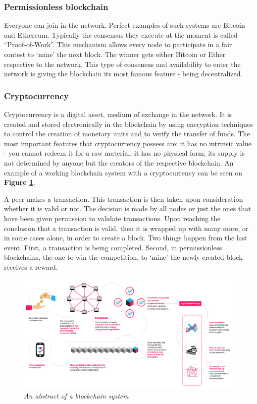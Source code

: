\documentclass[a4paper,11pt]{report}
\begin{document}
\subsubsection{Permissionless blockchain}
Everyone can join in the network. Perfect examples of such systems are Bitcoin and Ethereum. Typically the consensus they execute at the moment is called “Proof-of-Work”. This mechanism allows every node to participate in a fair contest to ‘mine’ the next block. The winner gets either Bitcoin or Ether respective to the network. This type of consensus and availability to enter the network is giving the blockchain its most famous feature - being decentralized.

\subsubsection{Cryptocurrency}
Cryptocurrency is a digital asset, medium of exchange in the network. It is created and stored electronically in the blockchain by using encryption techniques to control the creation of monetary units and to verify the transfer of funds. The most important features that cryptocurrency possess are: it has no intrinsic value - you cannot redeem it for a raw material; it has no physical form; its supply is not determined by anyone but the creators of the respective blockchain. \cite{whatIsCryptocurrency}
An example of a working blockchain system with a cryptocurrency can be seen on \textbf{Figure \ref{blockchainAbstract}}. 


A peer makes a transaction. This transaction is then taken upon consideration whether it is valid or not. The decision is made by all nodes or just the ones that have been given permission to validate transactions. Upon reaching the conclusion that a transaction is valid,  then it is wrapped up with many more, or in some cases alone, in order to create a block. Two things happen from the last event. First, a transaction is being completed. Second, in permissionless blockchains, the one to win the competition, to ‘mine’ the newly created block receives a reward. 

\begin{figure}[h]
\centering
  \includegraphics[width=16cm]{infographics0517-01-1.png}
  \caption{\textit{An abstract of a blockchain system \cite{whatIsBlockgeeks}}}
  \label{blockchainAbstract}
\end{figure}
\end{document}

